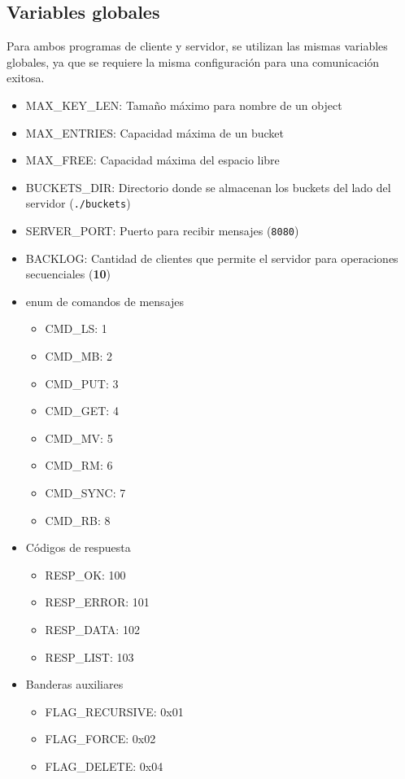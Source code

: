 \documentclass[12pt, letterpaper]{article}
\begin{document}
\subsection{Variables globales}
Para ambos programas de cliente y servidor, se utilizan las mismas variables globales, ya que se requiere la misma configuración para una comunicación exitosa.
\begin{itemize}
    \item MAX\_KEY\_LEN: Tamaño máximo para nombre de un object
    \item MAX\_ENTRIES: Capacidad máxima de un bucket
    \item MAX\_FREE: Capacidad máxima del espacio libre
    \item BUCKETS\_DIR: Directorio donde se almacenan los buckets del lado del servidor (\texttt{./buckets})
    \item SERVER\_PORT: Puerto para recibir mensajes (\texttt{8080})
    \item BACKLOG: Cantidad de clientes que permite el servidor para operaciones secuenciales (\textbf{10})
    \item enum de comandos de mensajes
    \begin{itemize}
        \item CMD\_LS: 1
        \item CMD\_MB: 2
        \item CMD\_PUT: 3
        \item CMD\_GET: 4
        \item CMD\_MV: 5
        \item CMD\_RM: 6
        \item CMD\_SYNC: 7
        \item CMD\_RB: 8
    \end{itemize}
    \item Códigos de respuesta
    \begin{itemize}
        \item RESP\_OK: 100
        \item RESP\_ERROR: 101
        \item RESP\_DATA: 102
        \item RESP\_LIST: 103
    \end{itemize}
    \item Banderas auxiliares
    \begin{itemize}
        \item FLAG\_RECURSIVE: 0x01
        \item FLAG\_FORCE: 0x02
        \item FLAG\_DELETE: 0x04
    \end{itemize}
\end{itemize}
\end{document}
